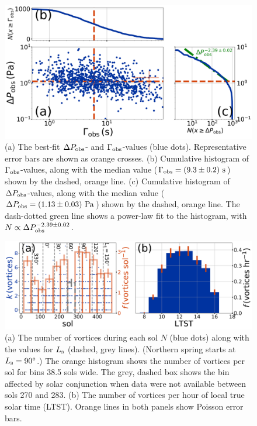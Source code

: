 \documentclass[linenumbers,trackchanges]{aastex63}
\begin{document}
\begin{figure}
    \centering
    \includegraphics[width=\textwidth]{figures/DeltaPobs_vs_Gammaobs.png}
    \caption{(a) The best-fit $\Delta P_{\rm obs}$- and $\Gamma_{\rm obs}$-values (blue dots). Representative error bars are shown as orange crosses. (b) Cumulative histogram of $\Gamma_{\rm obs}$-values, along with the median value ($\Gamma_{\rm obs} = \left( 9.3 \pm 0.2 \right)\,{\rm s}$) shown by the dashed, orange line. (c) Cumulative histogram of $\Delta P_{\rm obs}$-values, along with the median value ($\Delta P_{\rm obs} = \left( 1.13 \pm 0.03 \right)\,{\rm Pa}$) shown by the dashed, orange line. The dash-dotted green line shows a power-law fit to the histogram, with $N \propto \Delta P_{\rm obs}^{-2.39\pm0.02}$.}
    \label{fig:DeltaPobs_vs_Gammaobs}
\end{figure}

\begin{figure}
    \centering
    \includegraphics[width=\textwidth]{figures/sol_and_t0_histograms.png}
    \caption{(a) The number of vortices during each sol $N$ (blue dots) along with the values for $L_{\rm s}$ (dashed, grey lines). (Northern spring starts at $L_{\rm s} = 90^\circ$.) The orange histogram shows the number of vortices per sol for bins 38.5 sols wide. The grey, dashed box shows the bin affected by solar conjunction when data were not available between sols 270 and 283. (b) The number of vortices per hour of local true solar time (LTST). Orange lines in both panels show Poisson error bars.}
    \label{fig:sol_and_t0_histograms}
\end{figure}
\end{document}
